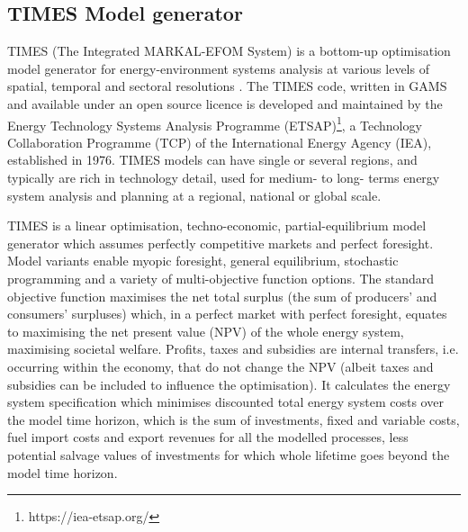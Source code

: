 \documentclass[gmd,manuscript]{copernicus}
\begin{document}
\subsection{TIMES Model generator}
\label{ss:times_code}
TIMES (The Integrated MARKAL-EFOM System) is a bottom-up optimisation model generator for energy-environment systems analysis at various levels of spatial, temporal and sectoral resolutions \citep{Loulou2016a,Loulou2016}. The TIMES code, written in GAMS and available under an open source licence \citep{IEA-ETSAP2020a} is developed and maintained by the Energy Technology Systems Analysis Programme (ETSAP)\footnote{https://iea-etsap.org/}, a Technology Collaboration Programme (TCP) of the International Energy Agency (IEA), established in 1976. TIMES models can have single or several regions, and typically are rich in technology detail, used for medium- to long- terms energy system analysis and planning at a regional, national or global scale. 

TIMES is a linear optimisation, techno-economic, partial-equilibrium model generator which assumes perfectly competitive markets and perfect foresight. Model variants enable myopic foresight, general equilibrium, stochastic programming and a variety of multi-objective function options. The standard objective function maximises the net total surplus (the sum of producers’ and consumers’ surpluses) which, in a perfect market with perfect foresight, equates to maximising the net present value (NPV) of the whole energy system, maximising societal welfare. Profits, taxes and subsidies are internal transfers, i.e. occurring within the economy, that do not change the NPV (albeit taxes and subsidies can be included to influence the optimisation). It calculates the energy system specification which minimises discounted total energy system costs over the model time horizon, which is the sum of investments, fixed and variable costs, fuel import costs and export revenues for all the modelled processes, less potential salvage values of investments for which whole lifetime goes beyond the model time horizon. 
\end{document}
